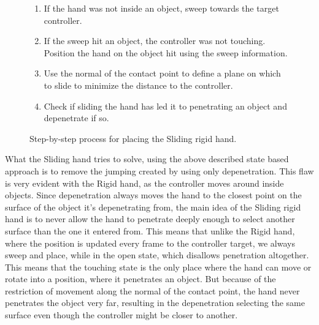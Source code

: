 \begin{figure}[H]
\begin{minipage}[t]{0.49\textwidth}
\begin{enumerate}[noitemsep]
\item If the hand was not inside an object, sweep towards the target controller.
\item If the sweep hit an object, the controller was not touching. Position the hand on the object hit using the sweep information.
\item Use the normal of the contact point to define a plane on which to slide to minimize the distance to the controller.
\item Check if sliding the hand has led it to penetrating an object and depenetrate if so.
\end{enumerate}
\end{minipage}
\caption{Step-by-step process for placing the Sliding rigid hand.}
\label{fig:stepByStepSlidingRigidHand}
\end{figure}


What the Sliding hand tries to solve, using the above described state based approach is to remove the jumping created by using only depenetration. This flaw is very evident with the Rigid hand, as the controller moves around inside objects. Since depenetration always moves the hand to the closest point on the surface of the object it's depenetrating from, the main idea of the Sliding rigid hand is to never allow the hand to penetrate deeply enough to select another surface than the one it entered from. This means that unlike the Rigid hand, where the position is updated every frame to the controller target, we always sweep and place, while in the open state, which disallows penetration altogether. This means that the touching state is the only place where the hand can move or rotate into a position, where it penetrates an object. But because of the restriction of movement along the normal of the contact point, the hand never penetrates the object very far, resulting in the depenetration selecting the same surface even though the controller might be closer to another.

